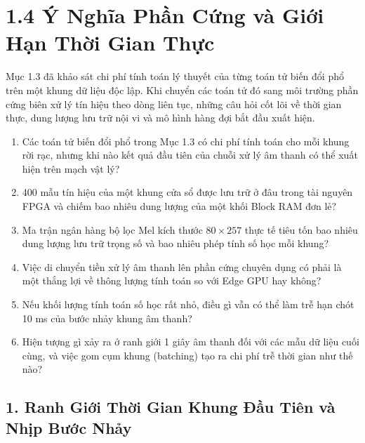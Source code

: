 \documentclass[11pt,a4paper]{article}
\begin{document}

\section*{1.4 Ý Nghĩa Phần Cứng và Giới Hạn Thời Gian Thực}

Mục 1.3 đã khảo sát chi phí tính toán lý thuyết của từng toán tử biến đổi phổ trên một khung dữ liệu độc lập. Khi chuyển các toán tử đó sang môi trường phần cứng biên xử lý tín hiệu theo dòng liên tục, những câu hỏi cốt lõi về thời gian thực, dung lượng lưu trữ nội vi và mô hình hàng đợi bắt đầu xuất hiện.

\begin{learningobj}
\begin{enumerate}
    \item Các toán tử biến đổi phổ trong Mục 1.3 có chi phí tính toán cho mỗi khung rời rạc, nhưng khi nào kết quả đầu tiên của chuỗi xử lý âm thanh có thể xuất hiện trên mạch vật lý?
    \item 400 mẫu tín hiệu của một khung cửa sổ được lưu trữ ở đâu trong tài nguyên FPGA và chiếm bao nhiêu dung lượng của một khối Block RAM đơn lẻ?
    \item Ma trận ngân hàng bộ lọc Mel kích thước $80 \times 257$ thực tế tiêu tốn bao nhiêu dung lượng lưu trữ trọng số và bao nhiêu phép tính số học mỗi khung?
    \item Việc di chuyển tiền xử lý âm thanh lên phần cứng chuyên dụng có phải là một thắng lợi về thông lượng tính toán so với Edge GPU hay không?
    \item Nếu khối lượng tính toán số học rất nhỏ, điều gì vẫn có thể làm trễ hạn chót 10 ms của bước nhảy khung âm thanh?
    \item Hiện tượng gì xảy ra ở ranh giới 1 giây âm thanh đối với các mẫu dữ liệu cuối cùng, và việc gom cụm khung (batching) tạo ra chi phí trễ thời gian như thế nào?
\end{enumerate}
\end{learningobj}

\subsection*{1. Ranh Giới Thời Gian Khung Đầu Tiên và Nhịp Bước Nhảy}
\end{document}

